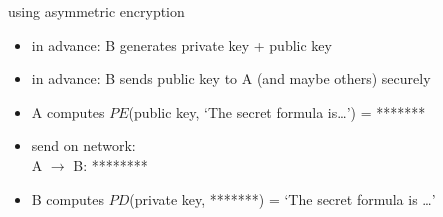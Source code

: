 \begin{frame}{using asymmetric encryption}
    \begin{itemize}
    \item in advance: B generates private key + public key
    \item in advance: B sends public key to A (and maybe others) securely
    \vspace{.5cm}
    \item A computes $PE$(public key, `The secret formula is\ldots') = *******
    \item send on network: \\
    A $\rightarrow$ B: ********
    \item B computes $PD$(private key, *******) = `The secret formula is \ldots'
    \end{itemize}
\end{frame}
